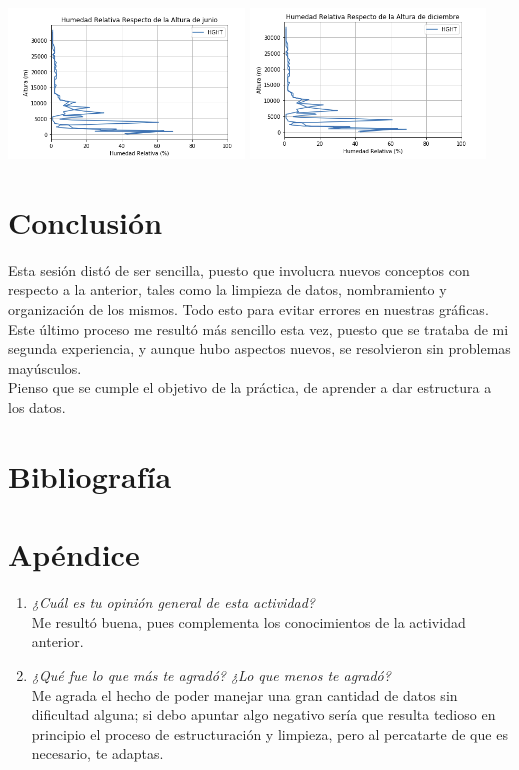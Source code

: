 \documentclass{article}
\begin{document}
\begin{doublespace}
\begin{itemize}
	\includegraphics[height=4cm]{act316.png}  \hspace*{\fill}
    \includegraphics[height=4cm]{act317.png}

\section{Conclusión}
Esta sesión distó de ser sencilla, puesto que involucra nuevos conceptos con respecto a la anterior, tales como la limpieza de datos, nombramiento y organización de los mismos. Todo esto para evitar errores en nuestras gráficas. Este último proceso me resultó más sencillo esta vez, puesto que se trataba de mi segunda experiencia, y aunque hubo aspectos nuevos, se resolvieron sin problemas mayúsculos.
\\
Pienso que se cumple el objetivo de la práctica, de aprender  a dar estructura a los datos.

\section{Bibliografía}

\section{Apéndice}
\begin{enumerate}
\item \textit{¿Cuál es tu opinión general de esta actividad?}
\\
Me resultó buena, pues complementa los conocimientos de la actividad anterior.

\item \textit{¿Qué fue lo que más te agradó? ¿Lo que menos te agradó?}
\\
Me agrada el hecho de poder manejar una gran cantidad de datos sin dificultad alguna; si debo apuntar algo negativo sería que resulta tedioso en principio el proceso de estructuración y limpieza, pero al percatarte de que es necesario, te adaptas.


\end{enumerate}
\end{itemize}
\end{doublespace}
\end{document}
